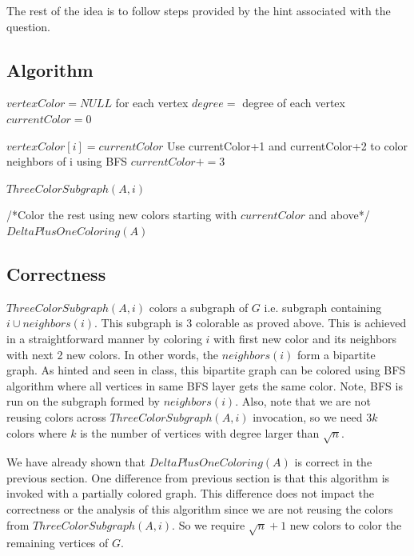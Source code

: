 \documentclass{article}
\begin{document}
The rest of the idea is to follow steps provided by the hint associated with the question.

\subsection*{Algorithm}
\begin{algorithm}
\begin{algorithmic}

\State $vertexColor = NULL$ for each vertex
\State $degree = $ degree of each vertex
\State $currentColor = 0$

    \State $vertexColor[i] = currentColor$
    \State Use currentColor+1 and currentColor+2 to color neighbors of i using BFS
    \State $currentColor += 3$
\EndProcedure

            \State $ThreeColorSubgraph(A, i)$
        \EndIf
    \EndFor

    \State /*Color the rest using new colors starting with $currentColor$ and above*/
    \State $DeltaPlusOneColoring(A)$
\EndProcedure
\end{algorithmic}
\end{algorithm}

\subsection*{Correctness}
$ThreeColorSubgraph(A, i)$ colors a subgraph of $G$ i.e. subgraph containing $i \cup neighbors(i)$. This subgraph is 3 colorable as proved above. This is achieved in a straightforward manner by coloring $i$ with first new color and its neighbors with next 2 new colors. In other words, the $neighbors(i)$ form a bipartite graph. As hinted and seen in class, this bipartite graph can be colored using BFS algorithm where all vertices in same BFS layer gets the same color. Note, BFS is run on the subgraph formed by $neighbors(i)$. Also, note that we are not reusing colors across $ThreeColorSubgraph(A, i)$ invocation, so we need $3k$ colors where $k$ is the number of vertices with degree larger than $\sqrt n$.

We have already shown that $DeltaPlusOneColoring(A)$ is correct in the previous section. One difference from previous section is that this algorithm is invoked with a partially colored graph. This difference does not impact the correctness or the analysis of this algorithm since we are not reusing the colors from $ThreeColorSubgraph(A, i)$. So we require $\sqrt n+1$ new colors to color the remaining vertices of $G$.
\end{document}
